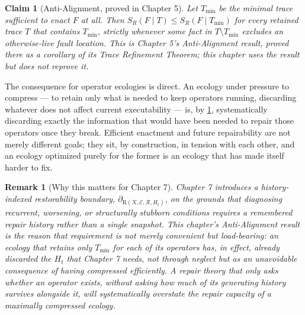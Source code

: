 \documentclass[12pt]{report}
\newtheorem{claim}[definition]{Claim}
\newtheorem{remark}[definition]{Remark}
\newcommand{\Rboundary}[1][]{\ensuremath{\partial_{\mathrm{R}#1}}}
\newcommand{\SR}{\ensuremath{S_R}}
\begin{document}
\begin{claim}[Anti-Alignment, proved in Chapter 5]
\label{claim:antialign}
Let $T_{\min}$ be the minimal trace sufficient to enact $F$ at all. Then
$\SR(F \mid T) \leq \SR(F \mid T_{\min})$ for every retained trace $T$
that contains $T_{\min}$, strictly whenever some fact in $T \setminus
T_{\min}$ excludes an otherwise-live fault location. This is Chapter 5's
Anti-Alignment result, proved there as a corollary of its Trace
Refinement Theorem; this chapter uses the result but does not reprove
it.
\end{claim}

The consequence for operator ecologies is direct. An ecology under
pressure to compress --- to retain only what is needed to keep operators
running, discarding whatever does not affect current executability ---
is, by \cref{claim:antialign}, systematically discarding exactly the
information that would have been needed to repair those operators once
they break. Efficient enactment and future repairability are not merely
different goals; they sit, by construction, in tension with each other,
and an ecology optimized purely for the former is an ecology that has
made itself harder to fix.

\begin{remark}[Why this matters for Chapter 7]
\label{rem:bridge-to-ch6}
Chapter 7 introduces a history-indexed restorability boundary,
$\Rboundary[(X,\mathcal{E},\mathcal{R},H_t)]$, on the grounds that
diagnosing recurrent, worsening, or structurally stubborn conditions
requires a remembered repair history rather than a single snapshot. This
chapter's Anti-Alignment result is the reason that requirement is not
merely convenient but load-bearing: an ecology that retains only
$T_{\min}$ for each of its operators has, in effect, already discarded
the $H_t$ that Chapter 7 needs, not through neglect but as an
unavoidable consequence of having compressed efficiently. A repair theory
that only asks whether an operator exists, without asking how much of its
generating history survives alongside it, will systematically overstate
the repair capacity of a maximally compressed ecology.
\end{remark}
\end{document}
